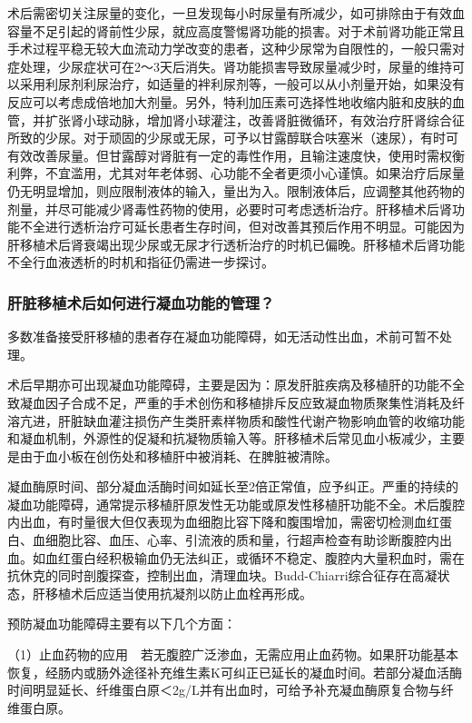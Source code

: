 术后需密切关注尿量的变化，一旦发现每小时尿量有所减少，如可排除由于有效血容量不足引起的肾前性少尿，就应高度警惕肾功能的损害。对于术前肾功能正常且手术过程平稳无较大血流动力学改变的患者，这种少尿常为自限性的，一般只需对症处理，少尿症状可在2～3天后消失。肾功能损害导致尿量减少时，尿量的维持可以采用利尿剂利尿治疗，如适量的袢利尿剂等，一般可以从小剂量开始，如果没有反应可以考虑成倍地加大剂量。另外，特利加压素可选择性地收缩内脏和皮肤的血管，并扩张肾小球动脉，增加肾小球灌注，改善肾脏微循环，有效治疗肝肾综合征所致的少尿。对于顽固的少尿或无尿，可予以甘露醇联合呋塞米（速尿），有时可有效改善尿量。但甘露醇对肾脏有一定的毒性作用，且输注速度快，使用时需权衡利弊，不宜滥用，尤其对年老体弱、心功能不全者更须小心谨慎。如果治疗后尿量仍无明显增加，则应限制液体的输入，量出为入。限制液体后，应调整其他药物的剂量，并尽可能减少肾毒性药物的使用，必要时可考虑透析治疗。肝移植术后肾功能不全进行透析治疗可延长患者生存时间，但对改善其预后作用不明显。可能因为肝移植术后肾衰竭出现少尿或无尿才行透析治疗的时机已偏晚。肝移植术后肾功能不全行血液透析的时机和指征仍需进一步探讨。

\subsubsection{肝脏移植术后如何进行凝血功能的管理？}

多数准备接受肝移植的患者存在凝血功能障碍，如无活动性出血，术前可暂不处理。

术后早期亦可出现凝血功能障碍，主要是因为：原发肝脏疾病及移植肝的功能不全致凝血因子合成不足，严重的手术创伤和移植排斥反应致凝血物质聚集性消耗及纤溶亢进，肝脏缺血灌注损伤产生类肝素样物质和酸性代谢产物影响血管的收缩功能和凝血机制，外源性的促凝和抗凝物质输入等。肝移植术后常见血小板减少，主要是由于血小板在创伤处和移植肝中被消耗、在脾脏被清除。

凝血酶原时间、部分凝血活酶时间如延长至2倍正常值，应予纠正。严重的持续的凝血功能障碍，通常提示移植肝原发性无功能或原发性移植肝功能不全。术后腹腔内出血，有时量很大但仅表现为血细胞比容下降和腹围增加，需密切检测血红蛋白、血细胞比容、血压、心率、引流液的质和量，行超声检查有助诊断腹腔内出血。如血红蛋白经积极输血仍无法纠正，或循环不稳定、腹腔内大量积血时，需在抗休克的同时剖腹探查，控制出血，清理血块。Budd-Chiarri综合征存在高凝状态，肝移植术后应适当使用抗凝剂以防止血栓再形成。

预防凝血功能障碍主要有以下几个方面：

（1）止血药物的应用　若无腹腔广泛渗血，无需应用止血药物。如果肝功能基本恢复，经肠内或肠外途径补充维生素K可纠正已延长的凝血时间。若部分凝血活酶时间明显延长、纤维蛋白原＜2g/L并有出血时，可给予补充凝血酶原复合物与纤维蛋白原。

